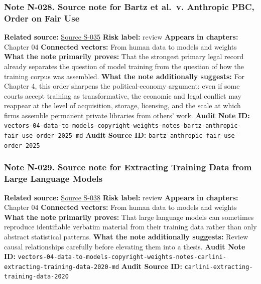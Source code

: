 \documentclass[
  american,
  11pt,
  letterpaper,
]{article}
\begin{document}
\subsubsection{Note N-028. Source note for Bartz et al.~v. Anthropic
PBC, Order on Fair
Use}\label{note-n-028-vectors-04-data-to-models-copyright-weights-notes-bartz-anthropic-fair-use-order-2025-md}

\textbf{Related source:}
\hyperref[source-s-035-bartz-et-al-v-anthropic-pbc-order-on-fair-use]{Source
S-035} \textbf{Risk label:} review \textbf{Appears in chapters:} Chapter
04 \textbf{Connected vectors:} From human data to models and weights
\textbf{What the note primarily proves:} That the strongest primary
legal record already separates the question of model training from the
question of how the training corpus was assembled. \textbf{What the note
additionally suggests:} For Chapter 4, this order sharpens the
political-economy argument: even if some courts accept training as
transformative, the economic and legal conflict may reappear at the
level of acquisition, storage, licensing, and the scale at which firms
assemble permanent private libraries from others' work. \textbf{Audit
Note ID:}
\texttt{vectors-04-data-to-models-copyright-weights-notes-bartz-anthropic-fair-use-order-2025-md}
\textbf{Audit Source ID:} \texttt{bartz-anthropic-fair-use-order-2025}

\subsubsection{Note N-029. Source note for Extracting Training Data from
Large Language
Models}\label{note-n-029-vectors-04-data-to-models-copyright-weights-notes-carlini-extracting-training-data-2020-md}

\textbf{Related source:}
\hyperref[source-s-038-extracting-training-data-from-large-language-models]{Source
S-038} \textbf{Risk label:} review \textbf{Appears in chapters:} Chapter
04 \textbf{Connected vectors:} From human data to models and weights
\textbf{What the note primarily proves:} That large language models can
sometimes reproduce identifiable verbatim material from their training
data rather than only abstract statistical patterns. \textbf{What the
note additionally suggests:} Review causal relationships carefully
before elevating them into a thesis. \textbf{Audit Note ID:}
\texttt{vectors-04-data-to-models-copyright-weights-notes-carlini-extracting-training-data-2020-md}
\textbf{Audit Source ID:} \texttt{carlini-extracting-training-data-2020}
\end{document}
